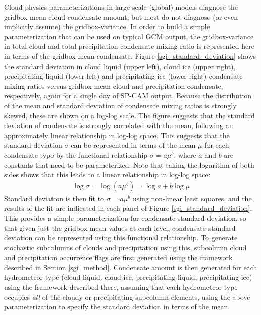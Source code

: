 Cloud physics parameterizations in large-scale (global) models diagnose the gridbox-mean cloud condensate amount, but most do not diagnose (or even implicitly assume) the gridbox-variance. In order to build a simple parameterization that can be used on typical GCM output, the gridbox-variance in total cloud and total precipitation condensate mixing ratio is represented here in terms of the gridbox-mean condensate. Figure \ref{sgi_standard_deviation} shows the standard deviation in cloud liquid (upper left), cloud ice (upper right), precipitating liquid (lower left) and precipitating ice (lower right) condensate mixing ratios versus gridbox mean cloud and precipitation condensate, respectively, again for a single day of SP-CAM output. Because the distribution of the mean and standard deviation of condensate mixing ratios is strongly skewed, these are shown on a log-log scale. The figure suggests that the standard deviation of condensate is strongly correlated with the mean, following an approximately linear relationship in log-log space. This suggests that the standard deviation $\sigma$ can be represented in terms of the mean $\mu$ for each condensate type by the functional relationship $\sigma = a \mu^b$, where $a$ and $b$ are constants that need to be parameterized. Note that taking the logarithm of both sides shows that this leads to a linear relationship in log-log space:
\begin{gather}
    \log \sigma = \log(a \mu^b) = \log a + b\log \mu
\end{gather}
Standard deviation is then fit to $\sigma = a \mu^b$ using non-linear least squares, and the results of the fit are indicated in each panel of Figure \ref{sgi_standard_deviation}. This provides a simple parameterization for condensate standard deviation, so that given just the gridbox mean values at each level, condensate standard deviation can be represented using this functional relationship. To generate stochastic subcolumns of clouds and precipitation using this, subcolumn cloud and precipitation occurrence flags are first generated using the framework described in Section \ref{sgi_method}. Condensate amount is then generated for each hydrometeor type (cloud liquid, cloud ice, precipitating liquid, precipitating ice) using the framework described there, assuming that each hydrometeor type occupies \emph{all} of the cloudy or precipitating subcolumn elements, using the above parameterization to specify the standard deviation in terms of the mean. %

